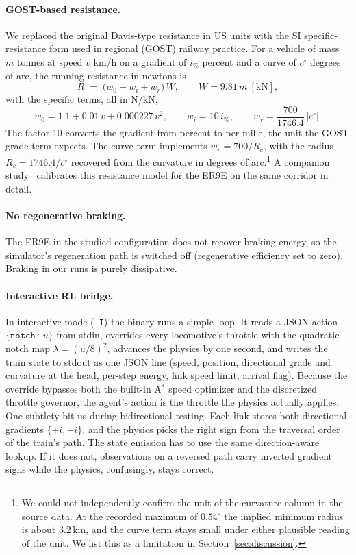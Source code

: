 \documentclass[11pt,a4paper]{article}
\begin{document}
\paragraph{GOST-based resistance.} We replaced the original Davis-type
resistance in US units with the SI specific-resistance form used in
regional (GOST) railway practice. For a vehicle of mass $m$ tonnes at
speed $v$ km/h on a gradient of $i_{\%}$ percent and a curve of
$c^{\circ}$ degrees of arc, the running resistance in newtons is
\begin{equation}
R \;=\; \bigl(w_0 + w_i + w_r\bigr)\, W,
\qquad W = 9.81\, m \ \mathrm{[kN]},
\label{eq:resistance}
\end{equation}
with the specific terms, all in N/kN,
\begin{equation*}
w_0 = 1.1 + 0.01\,v + 0.000227\,v^2,
\qquad
w_i = 10\, i_{\%},
\qquad
w_r = \frac{700}{1746.4}\,\bigl|c^{\circ}\bigr|.
\end{equation*}
The factor 10 converts the gradient from percent to per-mille, the unit
the GOST grade term expects. The curve term implements $w_r = 700/R_c$,
with the radius $R_c = 1746.4/c^{\circ}$ recovered from the curvature in
degrees of arc.\footnote{We could not independently confirm the unit of
the curvature column in the source data. At the recorded maximum of
$0.54^{\circ}$ the implied minimum radius is about 3.2\,km, and the curve
term stays small under either plausible reading of the unit. We list this
as a limitation in Section~\ref{sec:discussion}.} A companion
study~\cite{companion} calibrates this resistance model for the ER9E on
the same corridor in detail.

\paragraph{No regenerative braking.} The ER9E in the studied
configuration does not recover braking energy, so the simulator's
regeneration path is switched off (regenerative efficiency set to zero).
Braking in our runs is purely dissipative.

\paragraph{Interactive RL bridge.} In interactive mode (\texttt{-I}) the
binary runs a simple loop. It reads a JSON action
$\{\texttt{notch}\,{:}\,u\}$ from stdin, overrides every locomotive's
throttle with the quadratic notch map $\lambda = (u/8)^2$, advances the
physics by one second, and writes the train state to stdout as one JSON
line (speed, position, directional grade and curvature at the head,
per-step energy, link speed limit, arrival flag). Because the override
bypasses both the built-in A$^*$ speed optimizer and the discretized
throttle governor, the agent's action is the throttle the physics
actually applies. One subtlety bit us during bidirectional testing. Each
link stores both directional gradients $\{+i, -i\}$, and the physics
picks the right sign from the traversal order of the train's path. The
state emission has to use the same direction-aware lookup. If it does
not, observations on a reversed path carry inverted gradient signs while
the physics, confusingly, stays correct.
\end{document}
